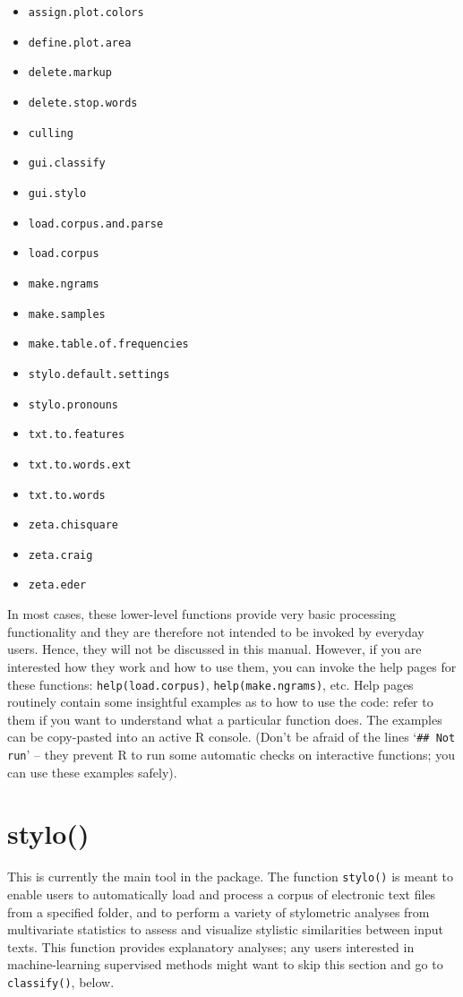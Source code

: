 \documentclass[11pt,a4paper]{article}
\def\code#1{{\tt #1}}
\begin{document}
\begin{itemize}
  \item \code{assign.plot.colors} 
  \item \code{define.plot.area} 
  \item \code{delete.markup}
  \item \code{delete.stop.words}
  \item \code{culling}  
  \item \code{gui.classify} 
  \item \code{gui.stylo} 
  \item \code{load.corpus.and.parse} 
  \item \code{load.corpus} 
  \item \code{make.ngrams} 
  \item \code{make.samples} 
  \item \code{make.table.of.frequencies} 
  \item \code{stylo.default.settings} 
  \item \code{stylo.pronouns} 
  \item \code{txt.to.features} 
  \item \code{txt.to.words.ext} 
  \item \code{txt.to.words} 
  \item \code{zeta.chisquare}
  \item \code{zeta.craig}
  \item \code{zeta.eder}
\end{itemize}

In most cases, these lower-level functions provide very basic processing
functionality and they are therefore not intended to be invoked by
everyday users. Hence, they will not be discussed in this manual.
However, if you are interested how they work and how to use them,
you can invoke the help pages for these functions: \code{help(load.corpus)},
\code{help(make.ngrams)}, etc. Help pages routinely contain some
insightful examples as to how to use the code: refer to them if you
want to understand what a particular function does. The examples can
be copy-pasted into an active R console. (Don't be afraid of the lines
`\code{\#\#~Not run}' -- they prevent R to run some automatic
checks on interactive functions; you can use these examples safely).


\section{stylo()}

This is currently the main tool in the package. The function \code{stylo()}
is meant to enable users to automatically load and process a corpus
of electronic text files from a specified folder, and to perform a
variety of stylometric analyses from multivariate statistics to assess
and visualize stylistic similarities between input texts. This function
provides explanatory analyses; any users interested in machine-learning
supervised methods might want to skip this section and go to 
\code{classify()}, below.
\end{document}
